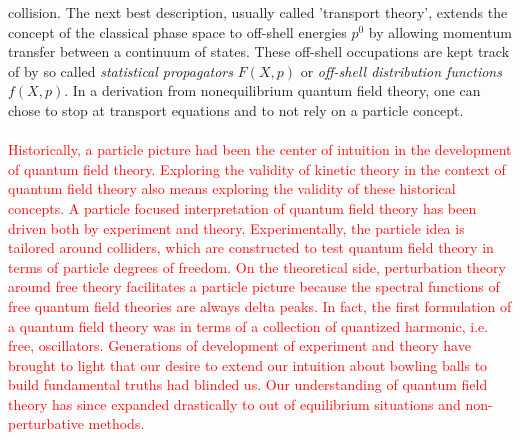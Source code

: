 collision. The next best description, usually called ’transport theory’, extends the concept of the classical
phase space to off-shell energies $p^0$ by allowing momentum transfer between a continuum of states. These
off-shell occupations are kept track of by so called \emph{statistical propagators} $F (X, p)$ or \emph{off-shell distribution
functions} $f (X, p)$. In a derivation from nonequilibrium quantum field theory, one can chose to stop at
transport equations and to not rely on a particle concept. \\
\\
\textcolor{red}{
Historically, a particle picture had been the center of intuition in the development of quantum field theory.
Exploring the validity of kinetic theory in the context of quantum field theory also means exploring the
validity of these historical concepts. A particle focused interpretation of quantum field theory has been
driven both by experiment and theory. Experimentally, the particle idea is tailored around colliders,
which are constructed to test quantum field theory in terms of particle degrees of freedom. On the
theoretical side, perturbation theory around free theory facilitates a particle picture because the spectral
functions of free quantum field theories are always delta peaks. In fact, the first formulation of a quantum
field theory was in terms of a collection of quantized harmonic, i.e. free, oscillators. Generations of
development of experiment and theory have brought to light that our desire to extend our intuition about
bowling balls to build fundamental truths had blinded us. Our understanding of quantum field theory
has since expanded drastically to out of equilibrium situations and non-perturbative methods.}
